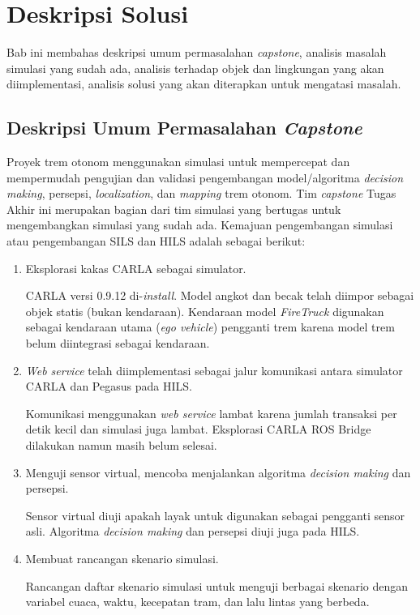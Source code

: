 \chapter{Deskripsi Solusi}

Bab ini membahas deskripsi umum permasalahan \textit{capstone}, analisis masalah
simulasi yang sudah ada, analisis terhadap objek dan lingkungan yang akan
diimplementasi, analisis solusi yang akan diterapkan untuk mengatasi masalah.

\section{Deskripsi Umum Permasalahan \textit{Capstone}}

Proyek trem otonom menggunakan simulasi untuk mempercepat dan mempermudah
pengujian dan validasi pengembangan model/algoritma \textit{decision making},
persepsi, \textit{localization}, dan \textit{mapping} trem otonom. Tim
\textit{capstone} Tugas Akhir ini merupakan bagian dari tim simulasi yang
bertugas untuk mengembangkan simulasi yang sudah ada. Kemajuan
pengembangan simulasi atau pengembangan SILS dan HILS adalah sebagai berikut:

\begin{enumerate}

	\item Eksplorasi kakas CARLA sebagai simulator.

	CARLA versi 0.9.12 di-\textit{install}. Model angkot dan becak telah diimpor
	sebagai objek statis (bukan kendaraan). Kendaraan model \textit{FireTruck}
	digunakan sebagai kendaraan utama (\textit{ego vehicle}) pengganti trem
	karena model trem belum diintegrasi sebagai kendaraan.

	\item \textit{Web service} telah diimplementasi sebagai jalur komunikasi
	antara simulator CARLA dan Pegasus pada HILS.

	Komunikasi menggunakan \textit{web service} lambat karena jumlah transaksi
	per detik kecil dan simulasi juga lambat. Eksplorasi CARLA ROS Bridge
	dilakukan namun masih belum selesai.

	\item Menguji sensor virtual, mencoba menjalankan algoritma \textit{decision
	making} dan persepsi.

	Sensor virtual diuji apakah layak untuk digunakan sebagai pengganti sensor
	asli. Algoritma \textit{decision making} dan persepsi diuji juga pada HILS.

	\item Membuat rancangan skenario simulasi.

	Rancangan daftar skenario simulasi untuk menguji berbagai skenario dengan
	variabel cuaca, waktu, kecepatan tram, dan lalu lintas yang berbeda.

\end{enumerate}

